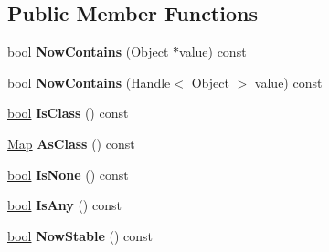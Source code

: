 \subsection*{Public Member Functions}
\begin{DoxyCompactItemize}
\item 
\mbox{\label{classv8_1_1internal_1_1FieldType_ad55daf695531fe444199b524f21eed8d}} 
\mbox{\hyperlink{classbool}{bool}} {\bfseries Now\+Contains} (\mbox{\hyperlink{classv8_1_1internal_1_1Object}{Object}} $\ast$value) const
\item 
\mbox{\label{classv8_1_1internal_1_1FieldType_af621a6104617265a2c0cf8b70a3043f5}} 
\mbox{\hyperlink{classbool}{bool}} {\bfseries Now\+Contains} (\mbox{\hyperlink{classv8_1_1internal_1_1Handle}{Handle}}$<$ \mbox{\hyperlink{classv8_1_1internal_1_1Object}{Object}} $>$ value) const
\item 
\mbox{\label{classv8_1_1internal_1_1FieldType_a33cdc8f4c38f8ef84ae15b97d8176730}} 
\mbox{\hyperlink{classbool}{bool}} {\bfseries Is\+Class} () const
\item 
\mbox{\label{classv8_1_1internal_1_1FieldType_a5716ccdbf692eb4f3887fa03fa44c916}} 
\mbox{\hyperlink{classv8_1_1internal_1_1Map}{Map}} {\bfseries As\+Class} () const
\item 
\mbox{\label{classv8_1_1internal_1_1FieldType_a528763b0f5f95f07c60f9970b38d2534}} 
\mbox{\hyperlink{classbool}{bool}} {\bfseries Is\+None} () const
\item 
\mbox{\label{classv8_1_1internal_1_1FieldType_a92d58009749e4d0340c058bd493f16b6}} 
\mbox{\hyperlink{classbool}{bool}} {\bfseries Is\+Any} () const
\item 
\mbox{\label{classv8_1_1internal_1_1FieldType_abb93274b363b404ae9e79f447c44dc3b}} 
\mbox{\hyperlink{classbool}{bool}} {\bfseries Now\+Stable} () const
\item 
\mbox{\label{classv8_1_1internal_1_1FieldType_a2c6a7951dc8077bff8256ab8c4a906bc}} 

\end{DoxyCompactItemize}
